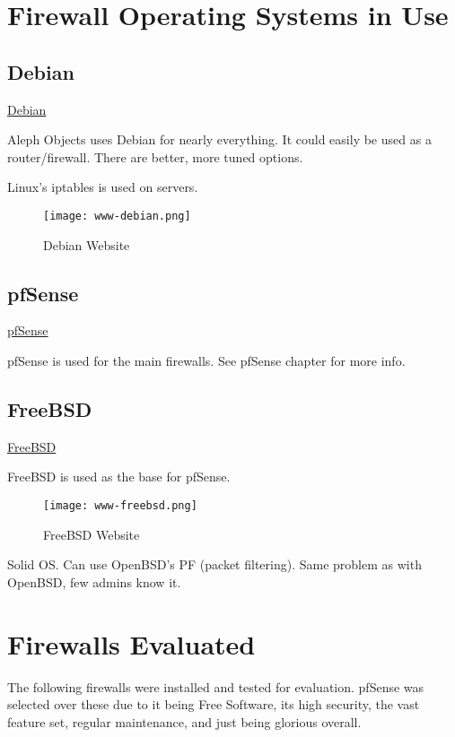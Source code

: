 \section{Firewall Operating Systems in Use}
\subsection{Debian}
 \href{https://www.debian.org/}{Debian}

Aleph Objects uses Debian for nearly everything. It could easily be used as a
router/firewall. There are better, more tuned options.

Linux's iptables is used on servers.

\begin{figure}[h!]
\texttt{[image: www-debian.png]}
 \caption{Debian Website}
 \label{fig:www-debian}
\end{figure}


\subsection{pfSense}
\href{https://www.pfsense.org/}{pfSense}

pfSense is used for the main firewalls. See pfSense chapter for more info.


\subsection{FreeBSD}
 \href{https://www.freebsd.org/}{FreeBSD}

FreeBSD is used as the base for pfSense.

\begin{figure}[h!]
\texttt{[image: www-freebsd.png]}
 \caption{FreeBSD Website}
 \label{fig:www-freebsd}
\end{figure}

Solid OS. Can use OpenBSD's PF (packet filtering). Same problem as with
OpenBSD, few admins know it.


\section{Firewalls Evaluated}
The following firewalls were installed and tested for evaluation. pfSense was
selected over these due to it being Free Software, its high security, the vast
feature set, regular maintenance, and just being glorious overall.

